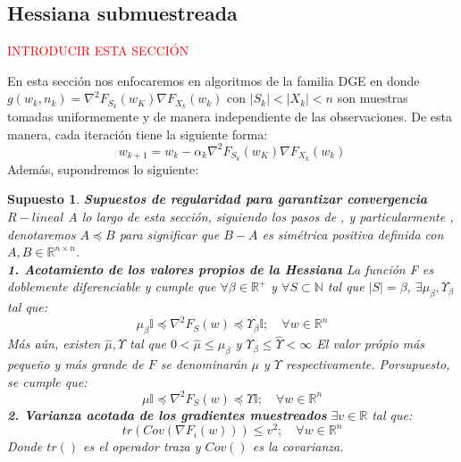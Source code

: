 \documentclass{book}
\theoremstyle{plain}
\newtheorem{assump}{Supuesto}[thm]
\theoremstyle{definition}
\theoremstyle{remark}
\begin{document}
\subsection{Hessiana submuestreada}

\textcolor{red}{INTRODUCIR ESTA SECCIÓN}

En esta sección nos enfocaremos en algoritmos de la familia DGE en donde $g(w_k, n_k)=\nabla^2F_{S_k}(w_K)\nabla F_{X_k}(w_k)$ con $|S_k| < |X_k| < n$ son muestras tomadas uniformemente y de manera independiente de las observaciones. De esta manera, cada iteración tiene la siguiente forma:
\begin{equation}\label{eq:gen_hess_alg}
    w_{k+1} = w_k - \alpha_k\nabla^2F_{S_k}(w_K)\nabla F_{X_k}(w_k)
\end{equation}
Además, supondremos lo siguiente:
\begin{assump}\label{assump:compHess} \textbf{Supuestos de regularidad para garantizar convergencia} $R-lineal$ A lo largo de esta sección, siguiendo los pasos de \cite{BYRD}, \cite{ROOSTA} y particularmente \cite{BOLLAPRAGADA}, denotaremos $A\preceq B$ para significar que $B-A$ es simétrica positiva definida con $A,B \in \mathbb{R}^{n\times n}$. \\
\textbf{1. Acotamiento de los valores propios de la Hessiana} La función F es doblemente diferenciable y cumple que $\forall\beta\in\mathbb{R}^+$ y $\forall S\subset\mathbb{N}$ tal que $|S| = \beta$, $\exists \mu_\beta, \Upsilon_\beta$ tal que:
\begin{equation}\label{eq:pos_def_subHess}
    \mu_\beta\mathbb{I}\preceq\nabla^2 F_S(w)\preceq \Upsilon_\beta\mathbb{I};\quad \forall w\in \mathbb{R}^n
\end{equation}
Más aún, existen $\hat{\mu}, \hat{\Upsilon}$ tal que $0 < \hat{\mu} \leq \mu_\beta$ y $\Upsilon_\beta \leq \hat{\Upsilon} < \infty$
El valor própio más pequeño y más grande de $F$ se denominarán  $\mu$ y $\Upsilon$ respectivamente. Porsupuesto, se cumple que:
\begin{equation}\label{eq:pos_def_hess}
    \mu\mathbb{I}\preceq\nabla^2 F_S(w)\preceq \Upsilon\mathbb{I};\quad \forall w\in \mathbb{R}^n
\end{equation}
\textbf{2. Varianza acotada de los gradientes muestreados}
$\exists v\in \mathbb{R}$ tal que:
\begin{equation}\label{eq:var_acot_grad_subHess}
tr(Cov(\nabla F_i(w))) \leq v^2; \quad \forall w\in \mathbb{R}^n
\end{equation}
Donde $tr()$ es el operador traza y $Cov()$ es la covarianza.

\end{assump}
\end{document}
